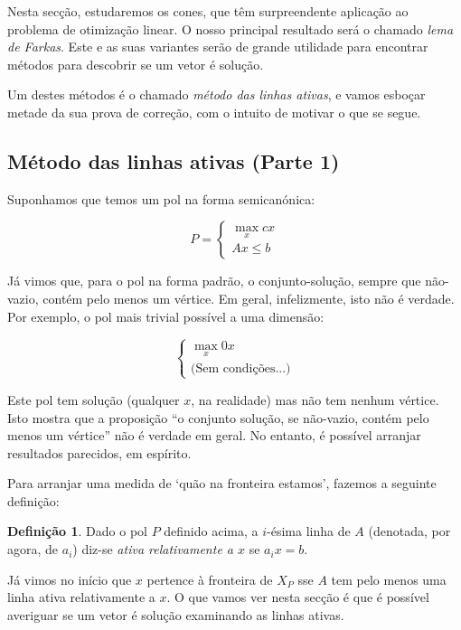 \documentclass{article}
\theoremstyle{definition}
\newtheorem{definition}{Definição}
\begin{document}
	Nesta secção, estudaremos os cones, que têm surpreendente aplicação ao problema de otimização linear. O nosso principal resultado será o chamado \emph{lema de Farkas}. Este e as suas variantes serão de grande utilidade para encontrar métodos para descobrir se um vetor é solução.
	
	Um destes métodos é o chamado \emph{método das linhas ativas}, e vamos esboçar metade da sua prova de correção, com o intuito de motivar o que se segue.
	
	\subsection{Método das linhas ativas (Parte 1)}
	
	Suponhamos que temos um pol na forma semicanónica:
	
	\[
	P =
	\begin{cases}
	\max\limits_x cx\\
	Ax \leq b
	\end{cases}
	\]
	
	Já vimos que, para o pol na forma padrão, o conjunto-solução, sempre que não-vazio, contém pelo menos um vértice. Em geral, infelizmente, isto não é verdade. Por exemplo, o pol mais trivial possível a uma dimensão:
	
	\[
	\begin{cases}
	\max\limits_x 0x\\
	\text{(Sem condições...)}
	\end{cases}
	\]
	
	Este pol tem solução (qualquer $x$, na realidade) mas não tem nenhum vértice. Isto mostra que a proposição ``o conjunto solução, se não-vazio, contém pelo menos um vértice'' não é verdade em geral. No entanto, é possível arranjar resultados parecidos, em espírito.
	
	Para arranjar uma medida de `quão na fronteira estamos', fazemos a seguinte definição:
	
	\begin{definition}
	Dado o pol $P$ definido acima, a $i$-ésima linha de $A$ (denotada, por agora, de $a_i$) diz-se \emph{ativa relativamente a $x$} se $a_i x = b$.
	\end{definition}
	
	Já vimos no início que $x$ pertence à fronteira de $X_P$ sse $A$ tem pelo menos uma linha ativa relativamente a $x$. O que vamos ver nesta secção é que é possível averiguar se um vetor é solução examinando as linhas ativas.
	
\end{document}
